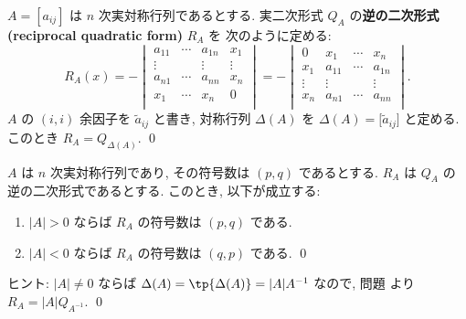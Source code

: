 \documentclass[12pt,twoside]{jarticle}
\begin{document}
\begin{question}[逆の二次形式]
\label{q:inv-q-form-1}
  $A=[a_{ij}]$ は $n$ 次実対称行列であるとする. 
  実二次形式 $Q_A$ の{\bf 逆の二次形式 (reciprocal quadratic form)} $R_A$ を
  次のように定める:
  \begin{equation*}
    R_A(x) = -
    \begin{vmatrix}
      a_{11} & \cdots & a_{1n} &  x_1   \\
      \vdots &        & \vdots & \vdots \\
      a_{n1} & \cdots & a_{nn} &  x_n   \\
       x_1   & \cdots &  x_n   &   0    \\
    \end{vmatrix}
    = -
    \begin{vmatrix}
        0    &  x_1   & \cdots &  x_n   \\
       x_1   & a_{11} & \cdots & a_{1n} \\
      \vdots & \vdots &        & \vdots \\
       x_n   & a_{n1} & \cdots & a_{nn} \\
    \end{vmatrix}.
  \end{equation*}
  $A$ の $(i,i)$ 余因子を $\tilde{a}_{ij}$ と書き, 
  対称行列 $\Delta(A)$ を $\Delta(A)=\bigl[\tilde{a}_{ij}\bigr]$ と定める.  
  このとき $R_A = Q_{\Delta(A)}$.
  \qed
\end{question}


\begin{question}
\label{q:inv-q-form-2}
  $A$ は $n$ 次実対称行列であり, その符号数は $(p,q)$ であるとする.
  $R_A$ は $Q_A$ の逆の二次形式であるとする. このとき, 以下が成立する:
  \begin{enumerate}
  \item $|A|>0$ ならば $R_A$ の符号数は $(p,q)$ である.
  \item $|A|<0$ ならば $R_A$ の符号数は $(q,p)$ である.
    \qed
  \end{enumerate}
\end{question}

\noindent
ヒント: $|A|\ne 0$ ならば $\Delta(A)=\tp{\Delta(A)}=|A|A^{-1}$ なので, 
問題  より $R_A = |A| Q_{A^{-1}}$. 
\qed
\end{document}
